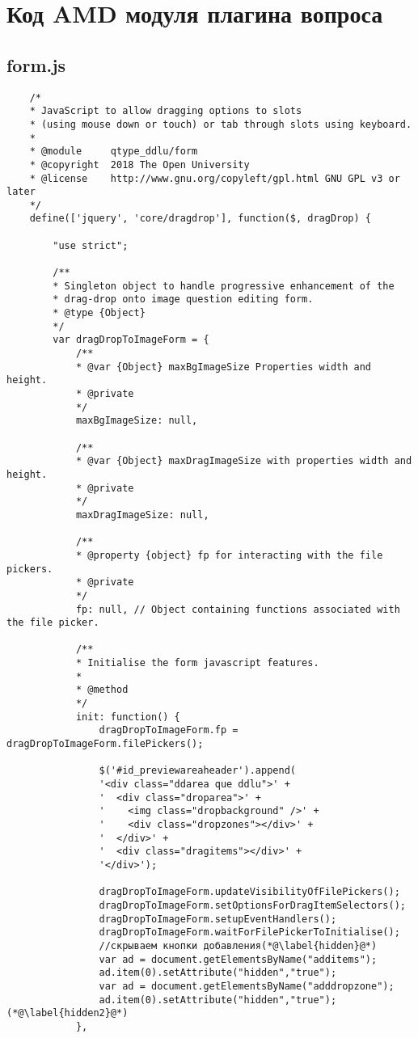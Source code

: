 \chapter{Код AMD модуля плагина вопроса}\label{ap1}							%
\section{form.js} \label{ap1:sec1}
\begin{lstlisting} 
	/*
	* JavaScript to allow dragging options to slots
	* (using mouse down or touch) or tab through slots using keyboard.
	*
	* @module     qtype_ddlu/form
	* @copyright  2018 The Open University
	* @license    http://www.gnu.org/copyleft/gpl.html GNU GPL v3 or later
	*/
	define(['jquery', 'core/dragdrop'], function($, dragDrop) {
		
		"use strict";
		
		/**
		* Singleton object to handle progressive enhancement of the
		* drag-drop onto image question editing form.
		* @type {Object}
		*/
		var dragDropToImageForm = {
			/**
			* @var {Object} maxBgImageSize Properties width and height.
			* @private
			*/
			maxBgImageSize: null,
			
			/**
			* @var {Object} maxDragImageSize with properties width and height.
			* @private
			*/
			maxDragImageSize: null,
			
			/**
			* @property {object} fp for interacting with the file pickers.
			* @private
			*/
			fp: null, // Object containing functions associated with the file picker.
			
			/**
			* Initialise the form javascript features.
			*
			* @method
			*/
			init: function() {
				dragDropToImageForm.fp = dragDropToImageForm.filePickers();
				
				$('#id_previewareaheader').append(
				'<div class="ddarea que ddlu">' +
				'  <div class="droparea">' +
				'    <img class="dropbackground" />' +
				'    <div class="dropzones"></div>' +
				'  </div>' +
				'  <div class="dragitems"></div>' +
				'</div>');
				
				dragDropToImageForm.updateVisibilityOfFilePickers();
				dragDropToImageForm.setOptionsForDragItemSelectors();
				dragDropToImageForm.setupEventHandlers();
				dragDropToImageForm.waitForFilePickerToInitialise();
				//скрываем кнопки добавления(*@\label{hidden}@*)
				var ad = document.getElementsByName("additems");
				ad.item(0).setAttribute("hidden","true");
				var ad = document.getElementsByName("adddropzone");
				ad.item(0).setAttribute("hidden","true");(*@\label{hidden2}@*)
			},
			

\end{lstlisting}

